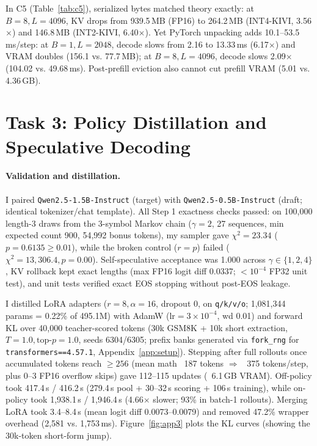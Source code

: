 \documentclass{article}
\begin{document}
In C5 (Table~\ref{tab:c5}), serialized bytes matched theory exactly: at $B=8, L=4096$, KV drops from 939.5\,MB (FP16) to 264.2\,MB (INT4-KIVI, 3.56$\times$) and 146.8\,MB (INT2-KIVI, 6.40$\times$). Yet PyTorch unpacking adds 10.1--53.5\,ms/step: at $B=1, L=2048$, decode slows from 2.16 to 13.33\,ms (6.17$\times$) and VRAM doubles (156.1 vs. 77.7\,MB); at $B=8, L=4096$, decode slows 2.09$\times$ (104.02 vs. 49.68\,ms). Post-prefill eviction also cannot cut prefill VRAM (5.01 vs. 4.36\,GB).

\section{Task 3: Policy Distillation and Speculative Decoding}

\paragraph{Validation and distillation.}
I paired \texttt{Qwen2.5-1.5B-Instruct} (target) with \texttt{Qwen2.5-0.5B-Instruct} (draft; identical tokenizer/chat template). All Step 1 exactness checks \citep{leviathan2023speculative,chen2023accelerating} passed: on 100,000 length-3 draws from the 3-symbol Markov chain ($\gamma=2$, 27 sequences, min expected count 900, 54,992 bonus tokens), my sampler gave $\chi^2=23.34$ ($p=0.6135 \ge 0.01$), while the broken control ($r=p$) failed ($\chi^2=13{,}306.4, p=0.00$). Self-speculative acceptance was 1.000 across $\gamma\in\{1,2,4\}$, KV rollback kept exact lengths (max FP16 logit diff 0.0337; $<10^{-4}$ FP32 unit test), and unit tests verified exact EOS stopping without post-EOS leakage.

I distilled LoRA adapters \citep{hu2022lora} ($r=8, \alpha=16$, dropout 0, on \texttt{q/k/v/o}; 1,081,344 params = 0.22\% of 495.1M) with AdamW ($\text{lr}=3\times 10^{-4}$, wd 0.01) and forward KL over 40,000 teacher-scored tokens (30k GSM8K \citealp{cobbe2021gsm8k} + 10k short extraction, $T=1.0, \text{top-}p=1.0$, seeds 6304/6305; prefix banks generated via \texttt{fork\_rng} for \texttt{transformers==4.57.1}, Appendix~\ref{app:setup}). Stepping after full rollouts once accumulated tokens reach $\ge 256$ (mean math ~187 tokens $\Rightarrow$ ~375 tokens/step, plus 0--3 FP16 overflow skips) gave 112--115 updates (~6.1\,GB VRAM). Off-policy took 417.4\,s / 416.2\,s (279.4\,s pool + 30--32\,s scoring + 106\,s training), while on-policy \citep{zhou2024distillspec,agarwal2024gkd} took 1,938.1\,s / 1,946.4\,s (4.66$\times$ slower; 93\% in batch-1 rollouts). Merging LoRA took 3.4--8.4\,s (mean logit diff 0.0073--0.0079) and removed 47.2\% wrapper overhead (2,581 vs. 1,753\,ms). Figure~\ref{fig:app3} plots the KL curves (showing the 30k-token short-form jump).
\end{document}
